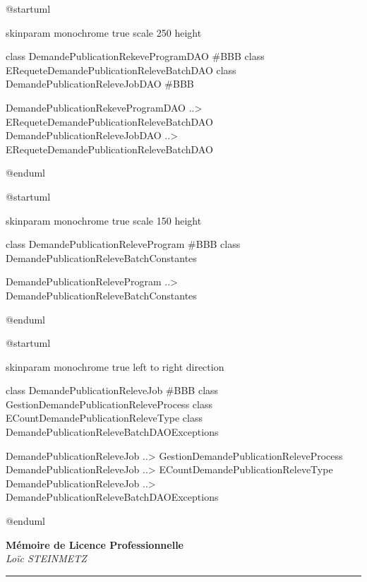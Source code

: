 \documentclass[a4paper, 12pt]{report}
\begin{document}
\begin{center}
  \begin{plantuml}
    @startuml

    skinparam monochrome true
    scale 250 height

    class DemandePublicationRekeveProgramDAO #BBB
    class ERequeteDemandePublicationReleveBatchDAO
    class DemandePublicationReleveJobDAO #BBB

    DemandePublicationRekeveProgramDAO ..> ERequeteDemandePublicationReleveBatchDAO
    DemandePublicationReleveJobDAO ..> ERequeteDemandePublicationReleveBatchDAO

    @enduml
  \end{plantuml}

  \vspace{0.5cm}

  \begin{plantuml}
    @startuml

    skinparam monochrome true
    scale 150 height

    class DemandePublicationReleveProgram #BBB
    class DemandePublicationReleveBatchConstantes

    DemandePublicationReleveProgram ..> DemandePublicationReleveBatchConstantes

    @enduml
  \end{plantuml}

  \vspace{1cm}

  \begin{plantuml}
    @startuml

    skinparam monochrome true
    left to right direction

    class DemandePublicationReleveJob #BBB
    class GestionDemandePublicationReleveProcess
    class ECountDemandePublicationReleveType
    class DemandePublicationReleveBatchDAOExceptions

    DemandePublicationReleveJob ..> GestionDemandePublicationReleveProcess
    DemandePublicationReleveJob ..> ECountDemandePublicationReleveType
    DemandePublicationReleveJob ..> DemandePublicationReleveBatchDAOExceptions

    @enduml
  \end{plantuml}
\end{center}

\clearpage
\pagestyle{empty}
{
  \renewcommand{\thispagestyle}[1]{}
  \tableofcontents
}

\clearpage
\thispagestyle{empty}
\null
\vspace{1cm}
\begin{center}
  \LARGE\textbf{Mémoire de Licence Professionnelle}\\
  \vspace{0.3cm}
  \large\textit{Loïc STEINMETZ}\\
  \vspace{0.5cm}
  \rule{\textwidth}{0.4pt}
\end{center}
\vspace{0.5cm}
\end{document}
